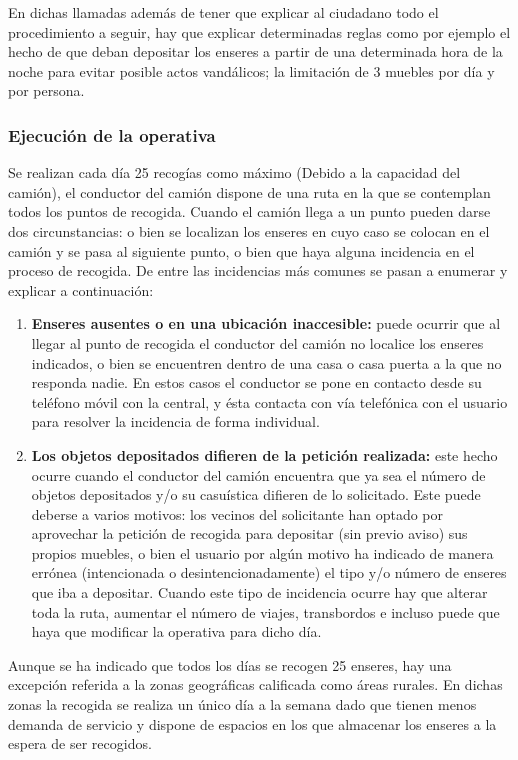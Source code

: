 En dichas llamadas además de  tener que explicar al ciudadano todo el procedimiento a seguir, hay que explicar determinadas reglas como por ejemplo el hecho de que deban depositar los enseres a partir de una determinada hora de la noche para evitar posible actos vandálicos; la limitación de 3 muebles por día y por persona. \\

\subsubsection	*{Ejecución de la operativa}
Se realizan cada día 25 recogías como máximo (Debido a la capacidad del camión), el conductor del camión dispone de una ruta en la que se contemplan todos los puntos de recogida. Cuando el camión llega a un punto pueden darse dos circunstancias: o bien se localizan los enseres en cuyo caso se colocan en el camión y se pasa al siguiente punto, o bien que haya alguna incidencia en el proceso de recogida. De entre las incidencias más comunes se pasan a enumerar y explicar a continuación: \\

\begin{enumerate}
\item \textbf{Enseres ausentes o en una ubicación inaccesible: }puede ocurrir que al llegar al punto de recogida el conductor del camión no localice los enseres indicados, o bien se encuentren dentro de una casa o casa puerta a la que no responda nadie. En estos casos el conductor se pone en contacto desde su teléfono móvil con la central, y ésta contacta con vía telefónica con el usuario para resolver la incidencia de forma individual.
\item \textbf{Los objetos depositados difieren de la petición realizada: }este hecho ocurre cuando el conductor del camión encuentra que ya sea el número de objetos depositados y/o su casuística difieren de lo solicitado. Este puede deberse a varios motivos:  los vecinos del solicitante han optado por aprovechar la petición de recogida para depositar (sin previo aviso) sus propios muebles, o bien el usuario por algún motivo ha indicado de manera errónea (intencionada o desintencionadamente) el tipo y/o número de enseres que iba a depositar. Cuando este tipo de incidencia ocurre hay que alterar toda la ruta, aumentar el número de viajes, transbordos e incluso puede que haya que modificar la operativa para dicho día.
\end{enumerate}

Aunque se ha indicado que todos los días se recogen 25 enseres, hay una excepción referida a la zonas geográficas calificada como áreas rurales. En dichas zonas la recogida se realiza un único día a la semana dado que tienen menos demanda de servicio y dispone de espacios en los que almacenar los enseres a la espera de ser recogidos. \\
